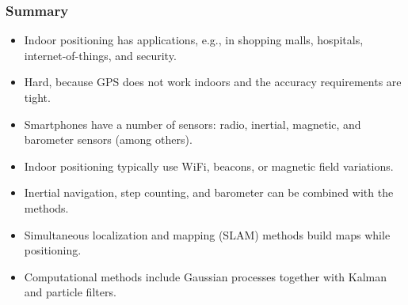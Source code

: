 \documentclass[xcolor=svgnames,english,presentation]{beamer}
\begin{document}
\begin{frame}
  \frametitle{Summary}

  \begin{itemize}[<+->]       
  \item \alert{Indoor positioning} has applications, e.g., in shopping malls, hospitals, internet-of-things, and security.
  \item Hard, because \alert{GPS does not work} indoors and the \alert{accuracy requirements} are tight.
  \item Smartphones have a number of sensors: \alert{radio, inertial, magnetic, and barometer sensors} (among others).
  \item Indoor positioning typically use \alert{WiFi, beacons, or magnetic field variations}.
  \item \alert{Inertial navigation, step counting, and barometer} can be combined with the methods.
  \item \alert{Simultaneous localization and mapping (SLAM)} methods build maps while positioning.
  \item Computational methods include \alert{Gaussian processes} together with \alert{Kalman and particle filters}.
  \end{itemize}
\end{frame}
\end{document}
